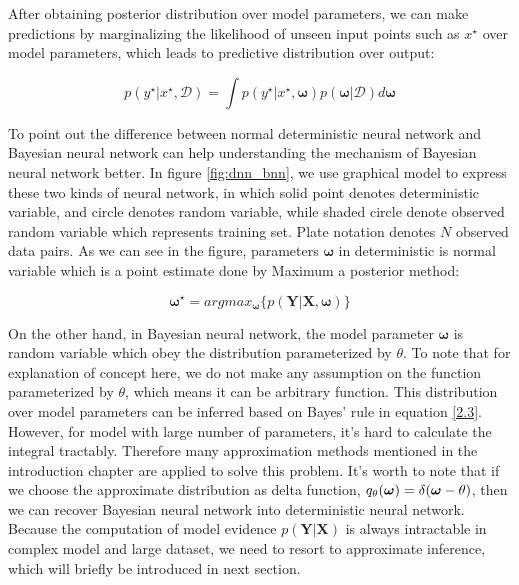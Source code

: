 After obtaining posterior distribution over model parameters, we can make predictions by marginalizing the likelihood of unseen input points such as $x^{\star}$ over model parameters, which leads to predictive distribution over output:

\begin{equation}
p(y^{\star}|x^{\star}, \mathcal D) = \int p(y^{\star}|x^{\star}, \boldsymbol{\omega})p(\boldsymbol{\omega}|\mathcal D)d\boldsymbol{\omega}
\label{2.4}
\end{equation}

To point out the difference between normal deterministic neural network and Bayesian neural network can help understanding the mechanism of Bayesian neural network better. In figure \ref{fig:dnn_bnn}, we use graphical model to express these two kinds of neural network, in which solid point denotes deterministic variable, and circle denotes random variable, while shaded circle denote observed random variable which represents training set. Plate notation denotes $N$ observed data pairs. As we can see in the figure, parameters $\boldsymbol{\omega}$ in deterministic is normal variable which is a point estimate done by Maximum a posterior method:

\begin{equation}
\boldsymbol{\omega^{\star}} = argmax_{\boldsymbol{\omega}}\{p(\mathbf{Y}|\mathbf{X}, \boldsymbol{\omega})\}\label{2.5}
\end{equation}

On the other hand, in Bayesian neural network, the model parameter $\boldsymbol{\omega}$ is random variable which obey the distribution parameterized by $\theta$. To note that for explanation of concept here, we do not make any assumption on the function parameterized by $\theta$, which means it can be arbitrary function. This distribution over model parameters can be inferred based on Bayes' rule in equation \ref{2.3}. However, for model with large number of parameters, it's hard to calculate the integral tractably. Therefore many approximation methods mentioned in the introduction chapter are applied to solve this problem. It's worth to note that if we choose the approximate distribution as delta function, $q_{\theta}(\boldsymbol \omega) = \delta(\boldsymbol \omega - \theta)$, then we can recover Bayesian neural network into deterministic neural network. Because the computation of model evidence $p(\mathbf{Y}|\mathbf{X})$ is always intractable in complex model and large dataset, we need to resort to approximate inference, which will briefly be introduced in next section.


